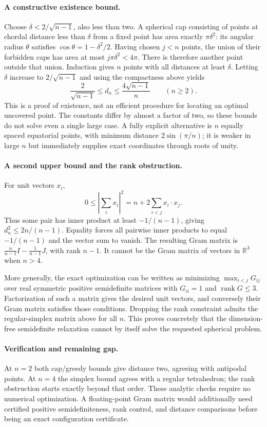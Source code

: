 \documentclass[11pt,a4paper]{article}
\begin{document}
\paragraph{A constructive existence bound.}
Choose $\delta<2/\sqrt{n-1}$, also less than two. A spherical cap consisting of points at chordal distance less than $\delta$ from a fixed point has area exactly $\pi\delta^2$: its angular radius $\theta$ satisfies $\cos\theta=1-\delta^2/2$. Having chosen $j<n$ points, the union of their forbidden caps has area at most $j\pi\delta^2<4\pi$. There is therefore another point outside that union. Induction gives $n$ points with all distances at least $\delta$. Letting $\delta$ increase to $2/\sqrt{n-1}$ and using the compactness above yields
\[
\frac2{\sqrt{n-1}}\le d_n\le\frac{4\sqrt{n-1}}n\qquad(n\ge2).
\]
This is a proof of existence, not an efficient procedure for locating an optimal uncovered point. The constants differ by almost a factor of two, so these bounds do not solve even a single large case. A fully explicit alternative is $n$ equally spaced equatorial points, with minimum distance $2\sin(\pi/n)$; it is weaker in large $n$ but immediately supplies exact coordinates through roots of unity.

\paragraph{A second upper bound and the rank obstruction.}
For unit vectors $x_i$,
\[
0\le\left|\sum_i x_i\right|^2
=n+2\sum_{i<j}x_i\cdot x_j.
\]
Thus some pair has inner product at least $-1/(n-1)$, giving $d_n^2\le2n/(n-1)$. Equality forces all pairwise inner products to equal $-1/(n-1)$ and the vector sum to vanish. The resulting Gram matrix is $\frac n{n-1}I-\frac1{n-1}J$, with rank $n-1$. It cannot be the Gram matrix of vectors in $\mathbb R^3$ when $n>4$.

More generally, the exact optimization can be written as minimizing $\max_{i<j}G_{ij}$ over real symmetric positive semidefinite matrices with $G_{ii}=1$ and $\operatorname{rank}G\le3$. Factorization of such a matrix gives the desired unit vectors, and conversely their Gram matrix satisfies those conditions. Dropping the rank constraint admits the regular-simplex matrix above for all $n$. This proves concretely that the dimension-free semidefinite relaxation cannot by itself solve the requested spherical problem.

\paragraph{Verification and remaining gap.}
At $n=2$ both cap/greedy bounds give distance two, agreeing with antipodal points. At $n=4$ the simplex bound agrees with a regular tetrahedron; the rank obstruction starts exactly beyond that order. These analytic checks require no numerical optimization. A floating-point Gram matrix would additionally need certified positive semidefiniteness, rank control, and distance comparisons before being an exact configuration certificate.
\end{document}

